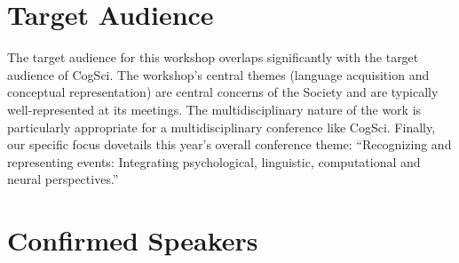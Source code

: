 \documentclass[10pt,letterpaper]{article}
\begin{document}
\section{Target Audience}

The target audience for this workshop overlaps significantly
with the target audience of CogSci. The workshop's central themes
(language acquisition and conceptual representation) are central concerns of the Society and are typically well-represented at
its meetings. The multidisciplinary nature of the work is particularly
appropriate for a multidisciplinary conference like CogSci. Finally,
our specific focus dovetails this year's overall conference theme: ``Recognizing and
representing events: Integrating psychological, linguistic,
computational and neural perspectives.''

\section{Confirmed Speakers}
\end{document}
